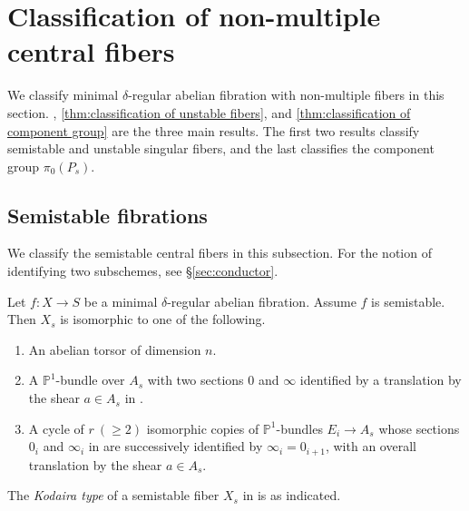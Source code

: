 \documentclass[reqno, letterpaper]{amsart}
\numberwithin{equation}{subsection}
\let\to\longrightarrow
\newcommand{\PP}{\mathbb{P}}
\begin{document}
\section{Classification of non-multiple central fibers} \label{sec:classification of non-multiple fibers}
	We classify minimal $\delta$-regular abelian fibration with non-multiple fibers in this section. , \ref{thm:classification of unstable fibers}, and \ref{thm:classification of component group} are the three main results. The first two results classify semistable and unstable singular fibers, and the last classifies the component group $\pi_0(P_s)$.
	
	
	
	\subsection{Semistable fibrations} \label{sec:classification of semistable fibers}
		We classify the semistable central fibers in this subsection. For the notion of identifying two subschemes, see \S \ref{sec:conductor}.
		
		\begin{theorem} \label{thm:classification of semistable fibers}
			Let $f : X \to S$ be a minimal $\delta$-regular abelian fibration. Assume $f$ is semistable. Then $X_s$ is isomorphic to one of the following.
			\begin{enumerate}
				\item[\textnormal{($\mathrm I_0$)}] An abelian torsor of dimension $n$.
				\item[\textnormal{($\mathrm I_1$)}] A $\PP^1$-bundle over $A_s$ with two sections $0$ and $\infty$ identified by a translation by the shear $a \in A_s$ in .
				\item[\textnormal{($\mathrm I_r$)}] A cycle of $r \ (\ge 2)$ isomorphic copies of $\PP^1$-bundles $E_i \to A_s$ whose sections $0_i$ and $\infty_i$ in  are successively identified by $\infty_i = 0_{i+1}$, with an overall translation by the shear $a \in A_s$.
			\end{enumerate}
		\end{theorem}
		
		\begin{definition} \label{def:Kodaira type semistable}
			The \emph{Kodaira type} of a semistable fiber $X_s$ in  is as indicated.
		\end{definition}
		
\end{document}
